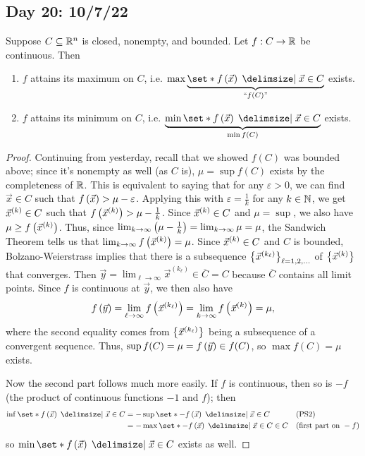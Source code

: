 \documentclass[main.tex]{subfiles}
\begin{document}
\subsection{Day 20: 10/7/22}

\begin{theorem}
    Suppose $C\subseteq \mathbb R^n$ is closed, nonempty, and bounded. Let $f : C\to \mathbb R$ be continuous. Then
    \begin{enumerate}
        \item $f$ attains its maximum on $C$, i.e. $\max\underbrace{\set*{f\parens{\vec{x}} \mid \vec{x} \in C}}_{``f(C)"}$ exists.
        \item $f$ attains its minimum on $C$, i.e. $\underbrace{\min\set*{f\parens{\vec{x}} \mid \vec{x} \in C}}_{\min f(C)}$ exists.
    \end{enumerate}
\end{theorem}

\begin{proof}
    Continuing from yesterday, recall that we showed $f(C)$ was bounded above; since it's nonempty as well (as $C$ is), $\mu = \sup f(C)$ exists by the completeness of $\mathbb R$. This is equivalent to saying that for any $\varepsilon > 0$, we can find $\vec{x}\in C$ such that $f\left( \vec{x} \right) > \mu - \varepsilon$. Applying this with $\varepsilon = \frac{1}{k}$ for any $k\in \mathbb N$, we get $\vec{x}^{(k)}\in C$ such that $f\left( \vec{x}^{(k)} \right) > \mu - \frac{1}{k}$. Since $\vec{x}^{(k)}\in C$ and $\mu = \sup$, we also have $\mu\ge f\left( \vec{x}^{(k)} \right)$. Thus, since $\lim_{k\to \infty} \left( \mu - \frac{1}{k} \right) = \lim_{k\to \infty} \mu = \mu$, the Sandwich Theorem tells us that $\lim_{k\to \infty} f\left( \vec{x}^{(k)} \right) = \mu$. Since $\vec{x}^{(k)}\in C$ and $C$ is bounded, Bolzano-Weierstrass implies that there is a subsequence $\left\{ \vec{x}^{(k_\ell)} \right\}_{\ell = 1, 2, \ldots}$ of $\left\{ \vec{x}^{(k)} \right\}$ that converges. Then $\vec{y} = \lim_{\ell \to \infty} \vec{x}^{(k_\ell)} \in \overline{C} = C$ because $\overline{C}$ contains all limit points. Since $f$ is continuous at $\vec{y}$, we then also have
    \[f\left( \vec{y} \right) = \lim_{\ell\to\infty} f\left( \vec{x}^{(k_\ell)} \right) = \lim_{k\to \infty} f\left( \vec{x}^{(k)} \right) = \mu,\]
    where the second equality comes from $\left\{ \vec{x}^{(k_\ell)} \right\}$ being a subsequence of a convergent sequence. Thus, $\sup f(C) = \mu = f\left( \vec{y} \right) \in f(C)$, so $\max f(C) = \mu$ exists.

    Now the second part follows much more easily. If $f$ is continuous, then so is $-f$ (the product of continuous functions $-1$ and $f$); then
    \begin{align*}
        \inf\set*{f\parens{\vec{x}} \mid \vec{x}\in C}
        &= -\sup\set*{-f\parens{\vec{x}} \mid \vec{x}\in C} && (\text{PS2})\\
        &= -\max\set*{-f\parens{\vec{x}} \mid \vec{x} \in C} \in C && (\text{first part on } -f)
    \end{align*}
    so $\min\set*{f\parens{\vec{x}} \mid \vec{x}\in C}$ exists as well.
\end{proof}
\end{document}
